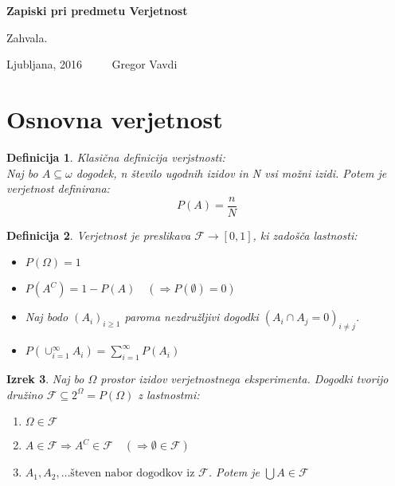 \documentclass[11pt]{article}
\newtheorem{Izrek}{{\sc Izrek}}[section]
\newtheorem{Definicija}[Izrek]{{\sc Definicija}}
\begin{document}
	
	\thispagestyle{empty}
	\begin{center}
		\begin{Large}
			{\bf Zapiski pri predmetu Verjetnost}
		\end{Large}
		
	\end{center}
	Zahvala.
	\vfill
	\begin{center}
		Ljubljana, 2016 $\quad \quad $ Gregor Vavdi
	\end{center}
	\newpage
	\setcounter{page}{1}
	
	\section{Osnovna verjetnost}
	\begin{Definicija}
		Klasična definicija verjstnosti:
		\\
		Naj bo  $A\subseteq \omega $ dogodek, n število ugodnih izidov in N vsi možni izidi. Potem je verjetnost definirana:
		$$P(A) = \frac{n}{N}$$
	\end{Definicija}
	
	\begin{Definicija}
		Verjetnost je preslikava $\mathcal{F}\to [0,1]$, ki zadošča lastnosti:
		\begin{itemize}
			\item
			$P(\Omega) = 1$
			\item
			$P(A^C) = 1 - P(A) \quad (\Rightarrow P(\emptyset) = 0)$
			\item
			Naj bodo $(A_i)_{i \ge 1} $ paroma nezdružljivi dogodki $(A_i \cap A_j = 0)_{i\neq j}$.
			\item
			$P(\cup_{i =1}^{\infty}A_i) = \sum_{i = 1}^{\infty}P(A_i)$
		\end{itemize}
	\end{Definicija}
	
	\begin{Izrek}
		Naj bo $\Omega$ prostor izidov verjetnostnega eksperimenta. Dogodki tvorijo družino $\mathcal{F} \subseteq 2^\Omega = P(\Omega)$ z lastnostmi:
		\begin{enumerate}
			\item
			$\Omega \in \mathcal{F}$
			\item
			$ A \in \mathcal{F} \Rightarrow A^C \in \mathcal{F} \quad (\Rightarrow \emptyset \in \mathcal{F})$
			\item
			$A_1, A_2,\dots \text{števen nabor dogodkov iz } \mathcal{F}$. Potem je $\bigcup A \in \mathcal{F}$
		\end{enumerate}
	\end{Izrek}
	
\end{document}
